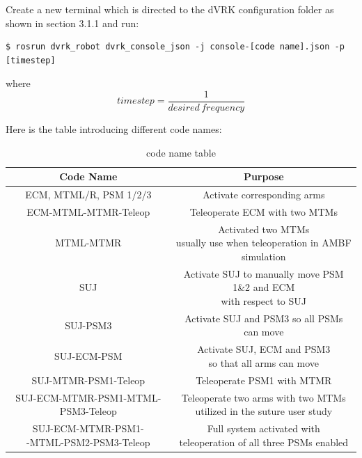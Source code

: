 Create a new terminal which is directed to the dVRK configuration folder as shown in section 3.1.1 and run:

\begin{verbatim}
$ rosrun dvrk_robot dvrk_console_json -j console-[code name].json -p [timestep]
\end{verbatim}
where
\begin{equation*}
    timestep = \frac{1}{desired \, frequency}
\end{equation*}

Here is the table introducing different code names:

\begin{table}[H]
    \centering
    \begin{tabular}{|c|c|}
    \hline
    Code Name & Purpose \\
    \hline
    ECM, MTML/R, PSM 1/2/3 & Activate corresponding arms \\
    \hline
    ECM-MTML-MTMR-Teleop & Teleoperate ECM with two MTMs \\
    \hline
    MTML-MTMR & \makecell{Activated two MTMs \\ usually use when teleoperation in AMBF simulation \cite{munawar2022open}} \\
    \hline
    SUJ & \makecell{Activate SUJ to manually move PSM 1\&2 and ECM \\ with respect to SUJ}\\
    \hline
    SUJ-PSM3 & Activate SUJ and PSM3 so all PSMs can move\\
    \hline
    SUJ-ECM-PSM & \makecell{Activate SUJ, ECM and PSM3 \\ so that all arms can move} \\
    \hline
    SUJ-MTMR-PSM1-Teleop & Teleoperate PSM1 with MTMR \\
    \hline
    SUJ-ECM-MTMR-PSM1-MTML-PSM3-Teleop & \makecell{Teleoperate two arms with two MTMs \\ utilized in the suture user study} \\
    \hline
    \makecell{SUJ-ECM-MTMR-PSM1-\\-MTML-PSM2-PSM3-Teleop} & \makecell{Full system activated with \\  teleoperation of all three PSMs enabled}  \\
    \hline
    \end{tabular}
    \caption{code name table}
    \label{tab:code_name}
\end{table}

